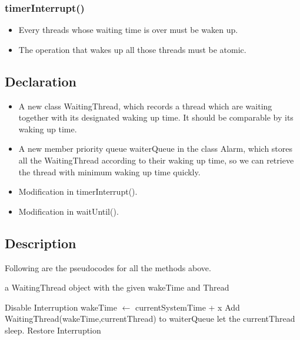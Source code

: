 \documentclass{article}
\begin{document}
	\subsubsection*{timerInterrupt()}
	\begin{itemize}
		\item Every threads whose waiting time is over must be waken up.
		
		\item The operation that wakes up all those threads must be atomic.
	\end{itemize}
	
	\subsection{Declaration}
	
	\begin{itemize}
		\item A new class WaitingThread, which records a thread which are waiting together with its designated waking up time. It should be comparable by its waking up time.
		
		\item A new member priority queue waiterQueue in the class Alarm, which stores all the WaitingThread according to their waking up time, so we can retrieve the thread with minimum waking up time quickly.
		
		\item Modification in timerInterrupt().
		
		\item Modification in waitUntil().
	\end{itemize}
	
	\subsection{Description}
	
	Following are the pseudocodes for all the methods above.
	
	\begin{algorithm}[H]
		\begin{algorithmic}
				\State \Return a WaitingThread object with the given wakeTime and Thread
			\EndProcedure
		\end{algorithmic}
	\end{algorithm}
	
	\begin{algorithm}[H]
		\begin{algorithmic}
			\Procedure {waitUntil(x)}{}
				\State Disable Interruption
				\State wakeTime $ \leftarrow$ currentSystemTime + x
				\State Add WaitingThread(wakeTime,currentThread) to waiterQueue
				\State let the currentThread sleep.
				\State Restore Interruption
			\EndProcedure
		\end{algorithmic}
	\end{algorithm}
	
\end{document}
